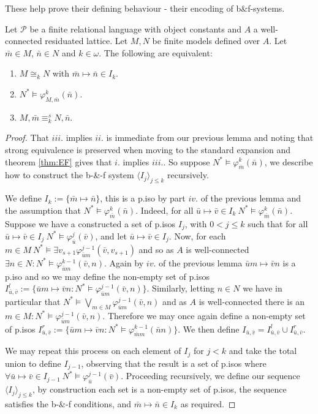\documentclass{lmcs} %
\newcommand{\?}{\ensuremath{\mkern0.4\thinmuskip}}
\let\biglor=\bigvee%
\let\isom=\cong%
\let\phi=\varphi
\newcommand{\CP}{\mathcal{P}}
\begin{document}
These help prove their defining behaviour - their encoding of b\&f-systems. 

\begin{lem}\label{lem:typeEF}
    Let $\CP$ be a finite relational language with object constants and $A$ a well-connected residuated lattice. Let $M,N$ be finite models defined over $A$. Let $\bar{m}\in M$, $\bar{n}\in N$ and $k\in\omega$. The following are equivalent:\begin{enumerate}[nosep, label=\roman*.]
        \item $M\isom_k N$ with $\bar{m}\mapsto\bar{n}\in I_k$.
        \item $N^\ast\models\phi^k_{M,\bar{m}}(\bar{n})$.
        \item $M,\bar{m}\equiv^s_k N,\bar{n}$.
    \end{enumerate}
\end{lem}
\begin{proof}
    That $iii.$ implies $ii.$ is immediate from our previous lemma and noting that strong equivalence is preserved when moving to the standard expansion and theorem \ref{thm:EF} gives that $i.$ implies $iii.$. So suppose $N^\ast\models\phi^k_{\bar{m}}(\bar{n})$, we describe how to construct the b-\&-f system $\langle I_j\rangle_{j\leq k}$ recursively. 
    
    We define $I_k:=\{\bar{m}\mapsto\bar{n}\}$, this is a p.iso by part $iv.$ of the previous lemma and the assumption that $N^\ast\models\phi^k_{\bar{m}}(\bar{n})$. Indeed, for all $\bar{u}\mapsto\bar{v}\in I_k\ N^\ast\models\phi^k_{\bar{m}}(\bar{n})$. Suppose we have a constructed a set of p.isos $I_j$, with $0<j\leq k$ such that for all $\bar{u}\mapsto\bar{v}\in I_j\ N^\ast\models\phi^{j}_{\bar{u}}(\bar{v})$, and let $\bar{u}\mapsto\bar{v}\in I_j$. Now, for each $m\in M\ N^\ast\models\exists v_{s+1}\phi^{j-1}_{\bar{u}m}(\bar{v},v_{s+1})$ and so as $A$ is well-connected $\exists n\in N:N^\ast\models\phi^{k-1}_{\bar{u}m}(\bar{v},n)$. Again by $iv.$ of the previous lemma $\bar{u}m\mapsto\bar{v}n$ is a p.iso and so we may define the non-empty set of p.isos $I^{l}_{\bar{u},\bar{v}}:=\{\bar{u}m\mapsto\bar{v}n:N^\ast\models\phi^{j-1}_{\bar{u}m}(\bar{v},n)\}$. Similarly, letting $n\in N$ we have in particular that $N^\ast\models\biglor\limits_{m\in M}\phi^{j-1}_{\bar{u}m}(\bar{v},n)$ and as $A$ is well-connected there is an $m\in M:N^\ast\models\phi^{j-1}_{\bar{u}m}(\bar{v},n)$. Therefore we may once again define a non-empty set of p.isos $I^{r}_{\bar{u},\bar{v}}:=\{\bar{u}m\mapsto\bar{v}n:N^\ast\models\phi^{k-1}_{\bar{m}m}(\bar{n}n)\}$. We then define $I_{\bar{u},\bar{v}}=I^{l}_{\bar{u},\bar{v}}\cup I^{r}_{\bar{u},\bar{v}}$. 

    We may repeat this process on each element of $I_j$ for $j<k$ and take the total union to define $I_{j-1}$, observing that the result is a set of p.isos where $\forall \bar{u}\mapsto\bar{v}\in I_{j-1}\ N^\ast\models\phi^{j-1}_{\bar{u}}(\bar{v})$. Proceeding recursively, we define our sequence $\langle I_j\rangle_{j\leq k}$,  by construction each set is a non-empty set of p.isos, the sequence satisfies the b-\&-f conditions, and $\bar{m}\mapsto\bar{n}\in I_k$ as required. 
\end{proof}
\end{document}
